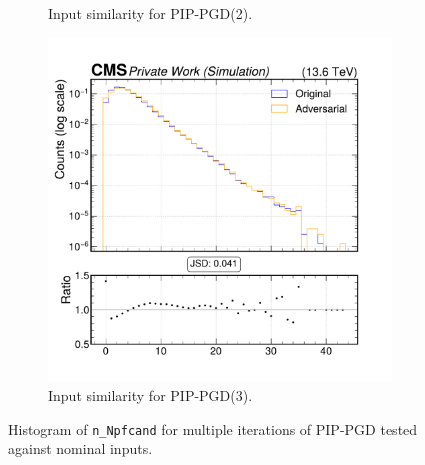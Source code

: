 \begin{figure}[h]
\begin{subfigure}[t]{0.32\textwidth}
    \caption*{Input similarity for PIP-PGD(2).}
  \end{subfigure}\hfill
  \begin{subfigure}[t]{0.32\textwidth}
    \includegraphics[width=\linewidth]{media/output/features/compare/combined_it_3/cmp_global_features_n_Npfcand.pdf}
    \caption*{Input similarity for PIP-PGD(3).}
  \end{subfigure}

  \caption*{Histogram of \texttt{n\_Npfcand} for multiple iterations of PIP-PGD tested against nominal inputs.}
  \label{fig:combined_input_n_Npfcand}
\end{figure}

